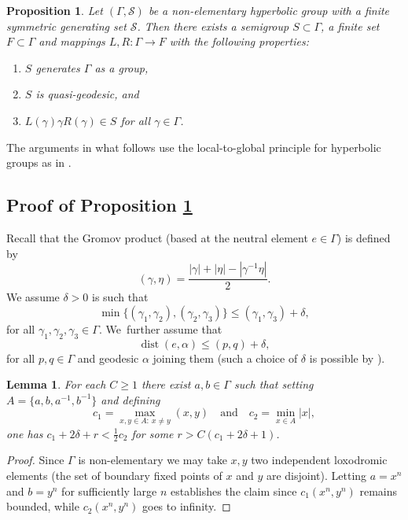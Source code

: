 \documentclass[JEP,XML,SOM,Unicode,NoEqCountersInSection,published]{cedram}
\newcommand{\quand}{\quad\text{and}\quad}
\newtheorem{proposition}[theorem]{Proposition}
\newtheorem{lemma}[theorem]{Lemma}
\newcommand{\cS}{\mathcal{S}}
\DeclareMathOperator{\dist}{dist}
\begin{document}
\begin{proposition}\label{semigrouplemma}
Let \((\Gamma,\cS)\) be a non-elementary hyperbolic group with a finite symmetric generating set \(\cS\). Then there exists a semigroup \(S \subset \Gamma\), a finite set \(F \subset \Gamma\) and mappings \(L,R:\Gamma \to F\) with the following properties:
\begin{enumerate}
\item \(S\) generates \(\Gamma\) as a group,
\item \(S\) is quasi-geodesic, and
\item \(L(\gamma)\gamma R(\gamma) \in S\) for all \(\gamma \in \Gamma\).
\end{enumerate}
\end{proposition}

The arguments in what follows use the local-to-global principle for hyperbolic groups as in \cite[\S 3]{gouezel}.

\subsection{Proof of Proposition \ref{semigrouplemma}}

Recall that the Gromov product (based at the neutral element \(e \in \Gamma\)) is defined by
\[
(\gamma,\eta) = \frac{|\gamma| + |\eta| - |\gamma^{-1}\eta|}{2}.
\]
We assume \(\delta > 0\) is such that
\[
\min\lbrace (\gamma_1,\gamma_2),(\gamma_2,\gamma_3)\rbrace \le (\gamma_1,\gamma_3) + \delta,
\]
for all \(\gamma_1,\gamma_2,\gamma_3 \in \Gamma\). We~further assume that
\[
\dist(e,\alpha) \le (p,q) + \delta,
\]
for all \(p,q \in \Gamma\) and geodesic \(\alpha\) joining them (such a choice of \(\delta\) is possible by \cite[Prop.\,1.22]{bridson-haefliger}).

\begin{lemma}
For each \(C \ge 1\) there exist \(a,b \in \Gamma\) such that setting \(A = \lbrace a,b,a^{-1},b^{-1}\rbrace\) and defining
\[
c_1 = \max_{x,y \in A:\ x \neq y}(x,y)\quand c_2 = \min_{x \in A}|x|,
\]
one has \(c_1 + 2\delta + r < \frac{1}{2}{c_2}\) for some \(r > C(c_1+2\delta+1)\).
\end{lemma}
\begin{proof}
Since \(\Gamma\) is non-elementary we may take \(x,y\) two independent loxodromic elements (\ie the set of boundary fixed points of \(x\) and \(y\) are disjoint).
Letting \(a = x^n\) and \(b = y^n\) for sufficiently large \(n\) establishes the claim since \(c_1(x^n,y^n)\) remains bounded, while \(c_2(x^n,y^n)\) goes to infinity.
\end{proof}
\end{document}
